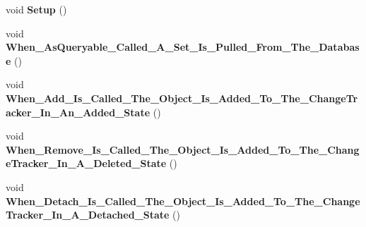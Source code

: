 \begin{DoxyCompactItemize}
\item 
\hypertarget{class_highway_1_1_data_1_1_entity_framework_1_1_tests_1_1_integration_tests_1_1_given___a___e_f___context_a1e9db068e164503c08d6d7df24a30e9c}{void {\bfseries Setup} ()}\label{class_highway_1_1_data_1_1_entity_framework_1_1_tests_1_1_integration_tests_1_1_given___a___e_f___context_a1e9db068e164503c08d6d7df24a30e9c}

\item 
\hypertarget{class_highway_1_1_data_1_1_entity_framework_1_1_tests_1_1_integration_tests_1_1_given___a___e_f___context_a84afc05586178c0c250ac6bb79fe3ce9}{void {\bfseries When\-\_\-\-As\-Queryable\-\_\-\-Called\-\_\-\-A\-\_\-\-Set\-\_\-\-Is\-\_\-\-Pulled\-\_\-\-From\-\_\-\-The\-\_\-\-Database} ()}\label{class_highway_1_1_data_1_1_entity_framework_1_1_tests_1_1_integration_tests_1_1_given___a___e_f___context_a84afc05586178c0c250ac6bb79fe3ce9}

\item 
\hypertarget{class_highway_1_1_data_1_1_entity_framework_1_1_tests_1_1_integration_tests_1_1_given___a___e_f___context_af48c7620f0044786d9283b55f4de4f8d}{void {\bfseries When\-\_\-\-Add\-\_\-\-Is\-\_\-\-Called\-\_\-\-The\-\_\-\-Object\-\_\-\-Is\-\_\-\-Added\-\_\-\-To\-\_\-\-The\-\_\-\-Change\-Tracker\-\_\-\-In\-\_\-\-An\-\_\-\-Added\-\_\-\-State} ()}\label{class_highway_1_1_data_1_1_entity_framework_1_1_tests_1_1_integration_tests_1_1_given___a___e_f___context_af48c7620f0044786d9283b55f4de4f8d}

\item 
\hypertarget{class_highway_1_1_data_1_1_entity_framework_1_1_tests_1_1_integration_tests_1_1_given___a___e_f___context_ae5ab8ccc3909f26d61a622933dffb18a}{void {\bfseries When\-\_\-\-Remove\-\_\-\-Is\-\_\-\-Called\-\_\-\-The\-\_\-\-Object\-\_\-\-Is\-\_\-\-Added\-\_\-\-To\-\_\-\-The\-\_\-\-Change\-Tracker\-\_\-\-In\-\_\-\-A\-\_\-\-Deleted\-\_\-\-State} ()}\label{class_highway_1_1_data_1_1_entity_framework_1_1_tests_1_1_integration_tests_1_1_given___a___e_f___context_ae5ab8ccc3909f26d61a622933dffb18a}

\item 
\hypertarget{class_highway_1_1_data_1_1_entity_framework_1_1_tests_1_1_integration_tests_1_1_given___a___e_f___context_a3197dc6bdfe69874df746e95c9a50ecf}{void {\bfseries When\-\_\-\-Detach\-\_\-\-Is\-\_\-\-Called\-\_\-\-The\-\_\-\-Object\-\_\-\-Is\-\_\-\-Added\-\_\-\-To\-\_\-\-The\-\_\-\-Change\-Tracker\-\_\-\-In\-\_\-\-A\-\_\-\-Detached\-\_\-\-State} ()}\label{class_highway_1_1_data_1_1_entity_framework_1_1_tests_1_1_integration_tests_1_1_given___a___e_f___context_a3197dc6bdfe69874df746e95c9a50ecf}

\end{DoxyCompactItemize}
